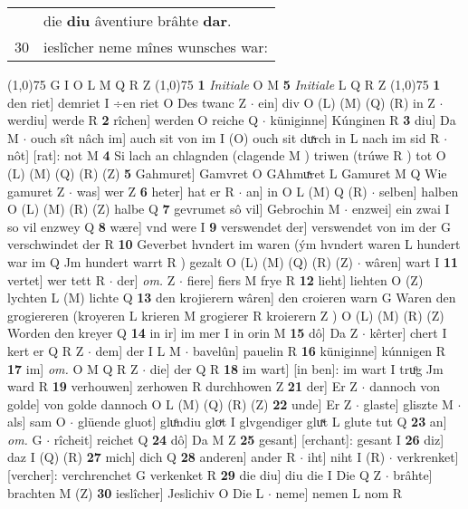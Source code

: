 \documentclass[8pt,a4paper,notitlepage]{article}
\begin{document}
\begin{table}[ht]
\begin{minipage}[t]{0.5\linewidth}
\begin{tabular}{rl}
 & die \textbf{diu} âventiure brâhte \textbf{dar}.\\ 
30 & ieslîcher neme mînes wunsches war:\\ 
\end{tabular}
\scriptsize
\line(1,0){75} \newline
G I O L M Q R Z \newline
\line(1,0){75} \newline
\textbf{1} \textit{Initiale} O M  \textbf{5} \textit{Initiale} L Q R Z  \newline
\line(1,0){75} \newline
\textbf{1} den riet] demriet I ÷en riet O Des twanc Z  $\cdot$ ein] div O (L) (M) (Q) (R) in Z  $\cdot$ werdiu] werde R \textbf{2} rîchen] werden O reiche Q  $\cdot$ küniginne] Kúnginen R \textbf{3} diu] Da M  $\cdot$ ouch sît nâch im] auch sit von im I (O) ouch sit duͯrch in L nach im sid R  $\cdot$ nôt] [rat]: not M \textbf{4} Si lach an chlagnden (clagende M ) triwen (trúwe R ) tot O (L) (M) (Q) (R) (Z) \textbf{5} Gahmuret] Gamvret O GAhmuͯret L Gamuret M Q Wie gamuret Z  $\cdot$ was] wer Z \textbf{6} heter] hat er R  $\cdot$ an] in O L (M) Q (R)  $\cdot$ selben] halben O (L) (M) (R) (Z) halbe Q \textbf{7} gevrumet sô vil] Gebrochin M  $\cdot$ enzwei] ein zwai I so vil enzwey Q \textbf{8} wære] vnd were I \textbf{9} verswendet der] verswendet von im der G verschwindet der R \textbf{10} Geverbet hvndert im waren (ým hvndert waren L hundert war im Q Jm hundert warrt R ) gezalt O (L) (M) (Q) (R) (Z)  $\cdot$ wâren] wart I \textbf{11} vertet] wer tett R  $\cdot$ der] \textit{om.} Z  $\cdot$ fiere] fiers M frye R \textbf{12} lieht] liehten O (Z) lychten L (M) lichte Q \textbf{13} den krojierern wâren] den croieren warn G Waren den grogiereren (kroyeren L krieren M grogierer R kroierern Z ) O (L) (M) (R) (Z) Worden den kreyer Q \textbf{14} in ir] im mer I in orin M \textbf{15} dô] Da Z  $\cdot$ kêrter] chert I kert er Q R Z  $\cdot$ dem] der I L M  $\cdot$ bavelûn] pauelin R \textbf{16} küniginne] kúnnigen R \textbf{17} im] \textit{om.} O M Q R Z  $\cdot$ die] der Q R \textbf{18} im wart] [in ben]: im wart I truͦg Jm ward R \textbf{19} verhouwen] zerhowen R durchhowen Z \textbf{21} der] Er Z  $\cdot$ dannoch von golde] von golde dannoch O L (M) (Q) (R) (Z) \textbf{22} unde] Er Z  $\cdot$ glaste] gliszte M  $\cdot$ als] sam O  $\cdot$ glüende gluot] gluͤndiu gloͮt I glvgendiger gluͯt L glute tut Q \textbf{23} an] \textit{om.} G  $\cdot$ rîcheit] reichet Q \textbf{24} dô] Da M Z \textbf{25} gesant] [erchant]: gesant I \textbf{26} diz] daz I (Q) (R) \textbf{27} mich] dich Q \textbf{28} anderen] ander R  $\cdot$ iht] niht I (R)  $\cdot$ verkrenket] [vercher]: verchrenchet G verkenket R \textbf{29} die diu] diu die I Die Q Z  $\cdot$ brâhte] brachten M (Z) \textbf{30} ieslîcher] Jeslichiv O Die L  $\cdot$ neme] nemen L nom R \newline

\end{minipage}
\end{table}
\end{document}
